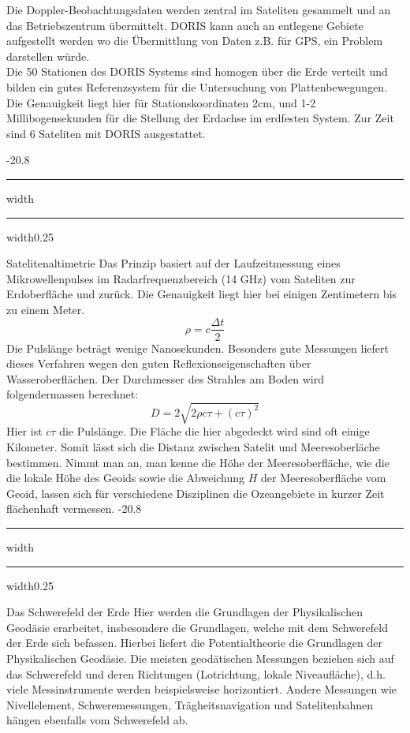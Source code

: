 \documentclass[8pt, landscape, fleqn]{scrartcl}
\makeatletter
\renewcommand{\section}{\@startsection{section}{1}{0mm}%
{-2\baselineskip}{0.8\baselineskip}%
{\hrule depth 0.2pt width\columnwidth\hrule depth1.5pt
width0.25\columnwidth\vspace*{1.2em}\Large\bfseries\rmfamily}}
\renewcommand{\subsection}{\@startsection{subsection}{1}{0mm}%
{-2\baselineskip}{0.8\baselineskip}%
{\hrule depth 0.2pt width\columnwidth\hrule depth0.75pt
width0.25\columnwidth\vspace*{1.2em}\large\bfseries\rmfamily}}
\makeatother
\begin{document}
\begin{multicols*}{3}
Die Doppler-Beobachtungsdaten werden zentral im Sateliten gesammelt und an das Betriebszentrum übermittelt. DORIS kann auch an entlegene Gebiete aufgestellt werden wo die Übermittlung von Daten z.B. für GPS, ein Problem darstellen würde. \\

Die 50 Stationen des DORIS Systems sind homogen über die Erde verteilt und bilden ein gutes Referenzsystem für die Untersuchung von Plattenbewegungen. Die Genauigkeit liegt hier für Stationskoordinaten 2cm, und 1-2 Millibogensekunden für die Stellung der Erdachse im erdfesten System. Zur Zeit sind 6 Sateliten mit DORIS ausgestattet.

\subsection{Satelitenaltimetrie}
Das Prinzip basiert auf der Laufzeitmessung eines Mikrowellenpulses im Radarfrequenzbereich (14 GHz) vom Sateliten zur Erdoberfläche und zurück. Die Genauigkeit liegt hier bei einigen Zentimetern bis zu einem Meter. 
\begin{equation*}
    \rho = c \frac{\Delta t}{2}
\end{equation*}
Die Pulslänge beträgt wenige Nanosekunden. Besonders gute Messungen liefert dieses Verfahren wegen den guten Reflexionseigenschaften über Wasseroberflächen. Der Durchmesser des Strahles am Boden wird folgendermassen berechnet:
\begin{equation*}
    D = 2 \sqrt{2 \rho c \tau + (c\tau)^2}
\end{equation*}
Hier ist $c\tau$ die Pulslänge. Die Fläche die hier abgedeckt wird sind oft einige Kilometer. Somit lässt sich die Distanz zwischen Satelit und Meeresoberläche bestimmen. Nimmt man an, man kenne die Höhe der Meeresoberfläche, wie die die lokale Höhe des Geoids sowie die Abweichung $H$ der Meeresoberfläche vom Geoid, lassen sich für verschiedene Disziplinen die Ozeangebiete in kurzer Zeit flächenhaft vermessen.
\section{Das Schwerefeld der Erde}
Hier werden die Grundlagen der Physikalischen Geodäsie erarbeitet, insbesondere die Grundlagen, welche mit dem Schwerefeld der Erde sich befassen. Hierbei liefert die Potentialtheorie die Grundlagen der Physikalischen Geodäsie. Die meisten geodätischen Messungen beziehen sich auf das Schwerefeld und deren Richtungen (Lotrichtung, lokale Niveaufläche), d.h. viele Messinstrumente werden beispielsweise horizontiert. Andere Messungen wie Nivellelement, Schweremessungen, Trägheitsnavigation und Satelitenbahnen hängen ebenfalls vom Schwerefeld ab.

\end{multicols*}
\end{document}
